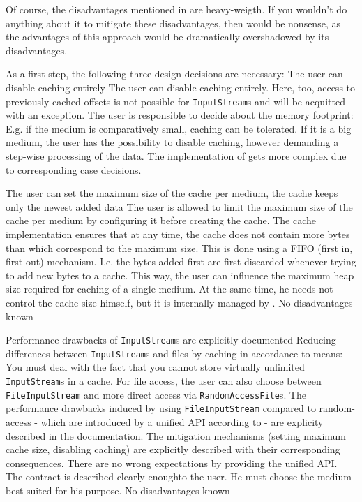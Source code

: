 Of course, the disadvantages mentioned in  are heavy-weigth. If you wouldn't do anything about it to mitigate these disadvantages, then  would be nonsense, as the advantages of this approach would be dramatically overshadowed by its disadvantages.

As a first step, the following three design decisions are necessary:
{%
The user can disable caching entirely
}
{%
The user can disable caching entirely. Here, too, access to previously cached offsets is not possible for \texttt{InputStream}s and will be acquitted with an exception.
}
{%
The user is responsible to decide about the memory footprint: E.g. if the medium is comparatively small, caching can be tolerated. If it is a big medium, the user has the possibility to disable caching, however demanding a step-wise processing of the data.
}
{%
The implementation of \COMPmedia{} gets more complex due to corresponding case decisions.
}


{%
The user can set the maximum size of the cache per medium, the cache keeps only the newest added data
}
{%
The user is allowed to limit the maximum size of the cache per medium by configuring it before creating the cache. The cache implementation ensures that at any time, the cache does not contain more bytes than which correspond to the maximum size. This is done using a FIFO (first in, first out) mechanism. I.e. the bytes added first are first discarded whenever trying to add new bytes to a cache.
}
{%
This way, the user can influence the maximum heap size required for caching of a single medium. At the same time, he needs not control the cache size himself, but it is internally managed by \COMPmedia{}
}.
{%
No disadvantages known
}

{%
Performance drawbacks of \texttt{InputStream}s are explicitly documented
}
{%
Reducing differences between \texttt{InputStream}s and files by caching in accordance to  means: You must deal with the fact that you cannot store virtually unlimited \texttt{InputStream}s in a cache. For file access, the user can also choose between \texttt{FileInputStream} and more direct access via \texttt{RandomAccessFile}s. The performance drawbacks induced by using \texttt{FileInputStream} compared to  random-access \-- which are introduced by a unified API according to  \-- are explicity described in the \LibName{} documentation. The mitigation mechanisms (setting maximum cache size, disabling caching) are explicitly described with their corresponding consequences.
}
{%
There are no wrong expectations by providing the unified API. The contract is described clearly enoughto the user. He must choose the medium best suited for his purpose.
}
{%
No disadvantages known
}

